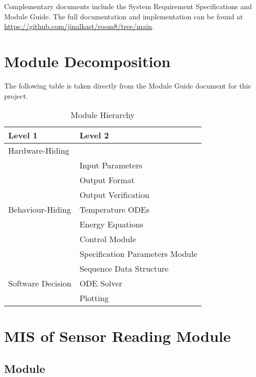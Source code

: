 \documentclass[12pt, titlepage]{article}
\begin{document}
Complementary documents include the System Requirement Specifications
and Module Guide.  The full documentation and implementation can be
found at \url{https://github.com/jinalkast/room8/tree/main}.  

\section{Module Decomposition}

The following table is taken directly from the Module Guide document for this project.

\begin{table}[h!]
\centering
\begin{tabular}{p{} p{}}
\toprule
\textbf{Level 1} & \textbf{Level 2}\\
\midrule

{Hardware-Hiding} & ~ \\
\midrule

\multirow{7}{0.3\textwidth}{Behaviour-Hiding} & Input Parameters\\
& Output Format\\
& Output Verification\\
& Temperature ODEs\\
& Energy Equations\\ 
& Control Module\\
& Specification Parameters Module\\
\midrule

\multirow{3}{0.3\textwidth}{Software Decision} & {Sequence Data Structure}\\
& ODE Solver\\
& Plotting\\
\bottomrule

\end{tabular}
\caption{Module Hierarchy}
\label{TblMH}
\end{table}

\newpage


\section{MIS of Sensor Reading Module} \label{Start} 

\subsection{Module}
\end{document}
